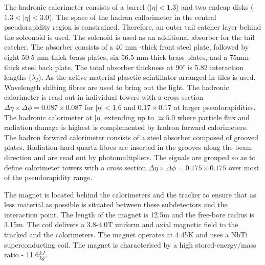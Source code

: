 The hadronic calorimeter \cite{HCAL_report} consists of a barrel ($\left|\eta\right| < 1.3 $) and two endcap disks ($1.3 < \left|\eta\right| < 3.0 $). The space of the hadron callorimeter in the central pseudorapidity region is constrained. Therefore, an outer tail catcher layer behind the soleonoid is used. The solenoid is used as an additional absorber for the tail catcher. The absorber consists of a 40 mm -thick front steel plate, followed by eight 50.5 mm-thick brass plates, six 56.5 mm-thick brass plates, and a 75mm-thick steel back plate. The total absorber thickness at 90$^{\circ}$ is 5.82 interaction lengths ($\lambda_{I}$). As the active material plasctic scintillator arranged in tiles is used. Wavelength shifting fibres are used to bring out the light. The hadronic calorimeter is read out in individual towers with a cross section $\Delta\eta\times\Delta\phi=0.087\times0.087$ for $\left|\eta\right|<1.6$ and $0.17\times0.17$ at larger pseudorapidities. The hadronic calorimeter at  $\left|\eta\right|$ extending up to $\simeq5.0$ where particle flux and radiation damage is highest is complemented by hadron forward calorimeters. The hadron forward calorimeter consists of a steel absorber composed of grooved plates. Radiation-hard quartz fibres are inserted in the grooves along the beam direction and are read out by photomultipliers. The signals are grouped so as to define calorimeter towers with a cross section $\Delta\eta\times\Delta\phi=0.175\times0.175$ over most of the pseudorapidity range. 

The magnet is located behind the calorimeters and the tracker to ensure that as less material as possible is situated between these subdetectors and the interaction point. The length of the magnet is 12.5m and the free-bore radius is 3.15m. The coil delivers a 3.8-4.0T uniform and axial magnetic field to the tracked and the calorimeters. The magnet operates at 4.45K and uses a NbTi superconducting coil. The magnet is characterised by a high stored-energy/mass ratio - 11.6$\frac{kJ}{kg}$.

